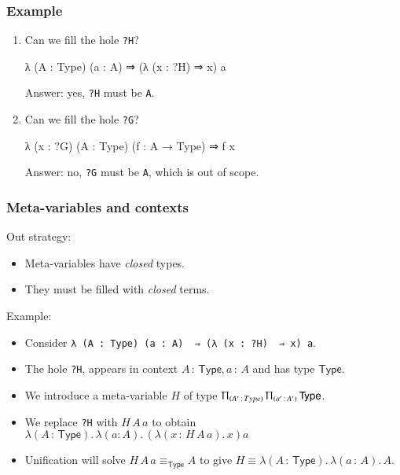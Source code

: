 \documentclass[handout,10pt,aspectratio=169]{beamer}
\newcommand{\of}{\,{:}\,} %
\newcommand{\Type}{\mathsf{Type}}
\newcommand{\prd}[1]{\Uppi_{(#1)}\,}
\newcommand{\lam}[1]{\lambda (#1).\,}
\begin{document}
\begin{frame}[fragile]
  \frametitle{Example}


  \begin{enumerate}
  \item Can we fill the hole \lstinline{?H}?
\begin{fauxttlisting}
  λ (A : Type) (a : A) ⇒ (λ (x : ?H) ⇒ x) a
\end{fauxttlisting}
    \pause
    Answer: yes, \lstinline{?H} must be \lstinline{A}.
  \item\pause
    Can we fill the hole \lstinline{?G}?
\begin{fauxttlisting}
  λ (x : ?G) (A : Type) (f : A → Type) ⇒ f x
\end{fauxttlisting}
    \pause
    Answer: no, \lstinline{?G} must be \lstinline{A}, which is out of scope.
  \end{enumerate}
\end{frame}

\begin{frame}[fragile]
  \frametitle{Meta-variables and contexts}

  Out strategy:
  \begin{itemize}
  \item Meta-variables have \emph{closed} types.
  \item They must be filled with \emph{closed} terms.
  \end{itemize}
  \pause
  Example:
  \begin{itemize}
  \item Consider \lstinline[style=fauxttstyle]{λ (A : Type) (a : A)  ⇒ (λ (x : ?H)  ⇒ x) a}.
  \item \pause The hole \lstinline{?H}, appears in context $A \of \Type, a \of A$ and has type $\Type$.
  \item \pause We introduce a meta-variable $H$ of type $\prd{A'\of Type} \prd{a' \of A'} \Type$.
  \item \pause We replace \lstinline{?H} with $H\, A\, a$ to obtain
    $\lam{A \of \Type} \lam{a : A} (\lam{x \of H\,A\,a} x) a$
  \item \pause Unification will solve $H\,A\,a \equiv_\Type A$ to give $H \equiv \lam{A \of \Type} \lam{a \of A} A$.
  \end{itemize}
\end{frame}
\end{document}
